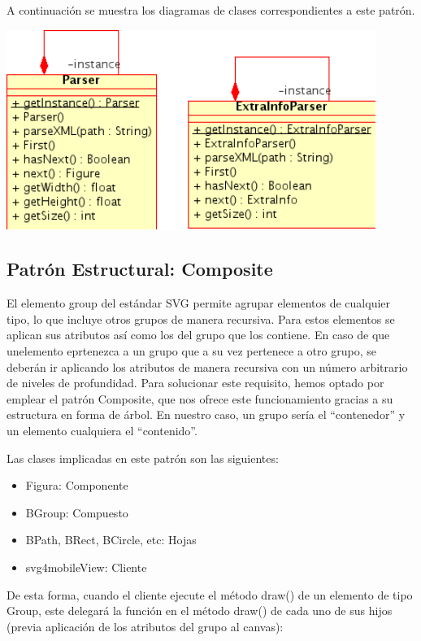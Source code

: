 \documentclass[a4paper,10pt]{article}
\begin{document}
A continuación se muestra los diagramas de clases correspondientes a este patrón.

\begin{center}
 \includegraphics[width=12cm]{singleton.png}
\end{center}

\subsection{Patrón Estructural: Composite}

El elemento group del estándar SVG permite agrupar elementos de cualquier tipo, lo que incluye otros grupos de manera recursiva. Para estos elementos se aplican sus atributos así como los del grupo que los contiene. En caso de que unelemento eprtenezca a un grupo que a su vez pertenece a otro grupo, se deberán ir aplicando los atributos de manera recursiva con un número arbitrario de niveles de profundidad. Para solucionar este requisito, hemos optado por emplear el patrón Composite, que nos ofrece este funcionamiento gracias a su estructura en forma de árbol. En nuestro caso, un grupo sería el ``contenedor'' y un elemento cualquiera el ``contenido''.

Las clases implicadas en este patrón son las siguientes:
\begin{itemize}
\item Figura: Componente
\item BGroup: Compuesto
\item BPath, BRect, BCircle, etc: Hojas
\item svg4mobileView: Cliente
\end{itemize}


De esta forma, cuando el cliente ejecute el método draw() de un elemento de tipo Group, este delegará la función en el método draw() de cada uno de sus hijos (previa aplicación de los atributos del grupo al canvas):
\end{document}
